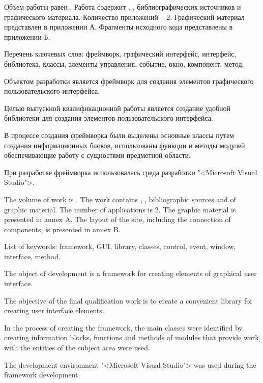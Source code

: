 
Объем работы равен . Работа содержит , ,  библиографических источников и  графического материала. Количество приложений – 2. Графический материал представлен в приложении А. Фрагменты исходного кода представлены в приложении Б.

Перечень ключевых слов: фреймворк, графический интерфейс, интерфейс, библиотека, классы, элементы управления, событие, окно, компонент, метод.

Объектом разработки является фреймворк для создания элементов графического пользовательского интерфейса.

Целью выпускной квалификационной работы является создание удобной библиотеки для создания элементов пользовательского интерфейса.

В процессе создания фреймворка были выделены основные классы путем создания информационных блоков, использованы функции и методы модулей, обеспечивающие работу с сущностями предметной области.

При разработке фреймворка использовалась среда разработки "<Microsoft Visual Studio">.

  
The volume of work is . The work contains , ,  bibliographic sources and  of graphic material. The number of applications is 2. The graphic material is presented in annex A. The layout of the site, including the connection of components, is presented in annex B.

List of keywords: framework, GUI, library, classes, control, event, window, interface, method.

The object of development is a framework for creating elements of graphical user interface.

The objective of the final qualification work is to create a convenient library for creating user interface elements.

In the process of creating the framework, the main classes were identified by creating information blocks, functions and methods of modules that provide work with the entities of the subject area were used.

The development environment "<Microsoft Visual Studio"> was used during the framework development.
